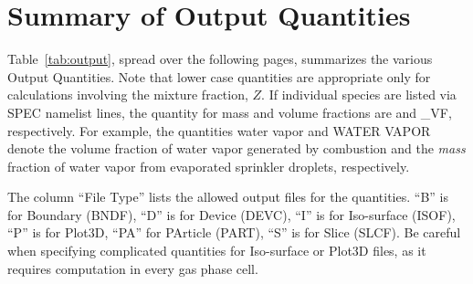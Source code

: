 \documentclass[11pt]{book}
\begin{document}
\clearpage
\section{Summary of Output Quantities}
\label{info:outputquantities}

Table~\ref{tab:output}, spread over the following pages, summarizes the various Output Quantities.
Note that lower case quantities are appropriate only for calculations involving the mixture fraction, $Z$. If
individual species are listed via {\ct SPEC} namelist lines, the quantity for mass and volume
fractions are {\ct [SPEC\_ID]} and {\ct [SPEC\_ID]\_VF}, respectively. For example, the quantities
{\ct water vapor} and {\ct WATER VAPOR} denote the volume fraction of water vapor
generated by combustion and the {\em mass} fraction of water vapor from evaporated sprinkler
droplets, respectively.

The column ``File Type'' lists the allowed output files for the quantities. ``B'' is for Boundary ({\ct BNDF}),
``D'' is for Device ({\ct DEVC}), ``I'' is for Iso-surface ({\ct ISOF}), ``P'' is for Plot3D, ``PA'' for PArticle ({\ct PART}),
``S'' is for Slice ({\ct SLCF}). Be careful
when specifying complicated quantities for Iso-surface or Plot3D files, as it requires computation in every gas phase cell.
\end{document}
